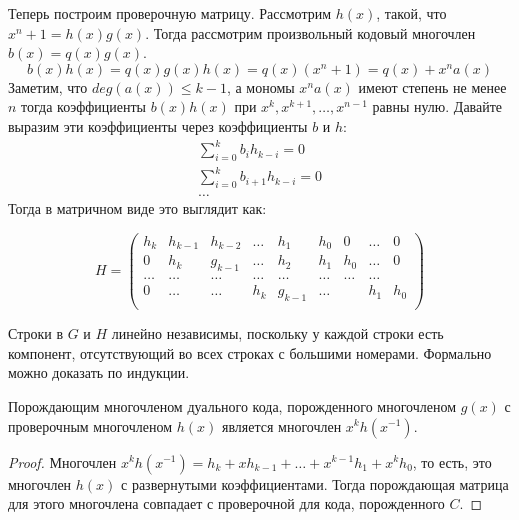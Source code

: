 Теперь построим проверочную матрицу. Рассмотрим $h(x)$, такой, что $x^n + 1 = h(x) g(x)$.
Тогда рассмотрим произвольный кодовый многочлен $b(x) = q(x) g(x)$. 
$$b(x) h(x) = q(x) g(x) h(x) = q(x) (x^n + 1) = q(x) + x^n a(x)$$
Заметим, что $deg(a(x)) \le k-1$, а мономы $x^n a(x)$ имеют степень не менее $n$
тогда коэффициенты $b(x) h(x)$ при $x^k, x^{k+1}, \ldots, x^{n-1}$ равны нулю.
Давайте выразим эти коэффициенты через коэффициенты $b$ и $h$:
$$\begin{array}{l}
  \sum\limits_{i=0}^k b_i h_{k-i} = 0 \\
  \sum\limits_{i=0}^k b_{i+1} h_{k-i} = 0 \\
  \ldots
\end{array}$$
Тогда в матричном виде это выглядит как:

$$H = \begin{pmatrix} h_k & h_{k-1} & h_{k-2} & \ldots & h_1 & h_0 & 0 & \ldots  & 0 \\
                 0 & h_k & g_{k-1}   & \ldots & h_{2} & h_{1} & h_0 & \ldots & 0 \\
                 \ldots   & \ldots   &   \ldots & \ldots & \ldots &\ldots &\ldots & \ldots &  \\
                0 & \ldots  &\ldots  & h_k & g_{k-1} & \ldots           &   & h_{1} & h_0 \\
  \end{pmatrix}$$  
  
\begin{remark}
Строки в $G$ и $H$ линейно независимы, поскольку у 
каждой строки есть компонент, отсутствующий во всех строках с большими
номерами. Формально можно доказать по индукции.
\end{remark}

\begin{remark}
Порождающим многочленом дуального кода, порожденного многочленом $g(x)$ 
с проверочным многочленом $h(x)$ является многочлен $x^k h(x^{-1})$.
\end{remark}
\begin{proof}
Многочлен $x^k h(x^{-1}) = h_k + x h_{k-1} + \ldots + x^{k-1} h_1 + x^k h_0$,
то есть, это многочлен $h(x)$ с развернутыми коэффициентами. Тогда порождающая
матрица для этого многочлена совпадает с проверочной для кода, порожденного
$C$.
\end{proof}

